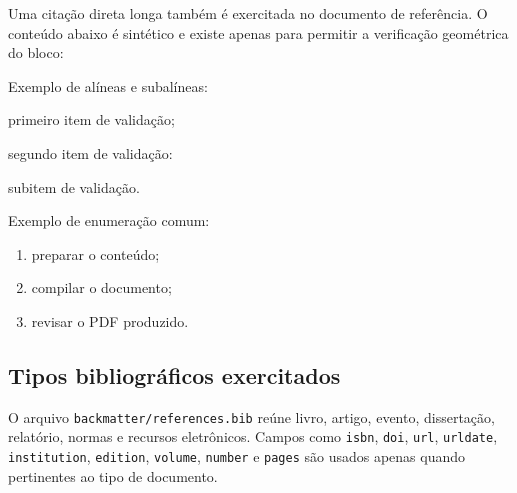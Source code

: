 Uma citação direta longa também é exercitada no documento de referência. O conteúdo abaixo é sintético e existe apenas para permitir a verificação geométrica do bloco:


Exemplo de alíneas e subalíneas:

\begin{ufclettereditems}
  \item primeiro item de validação;
  \item segundo item de validação:
    \begin{ufcdashedsubitems}
      \item subitem de validação.
    \end{ufcdashedsubitems}
\end{ufclettereditems}

Exemplo de enumeração comum:

\begin{enumerate}
  \item preparar o conteúdo;
  \item compilar o documento;
  \item revisar o PDF produzido.
\end{enumerate}

\subsection{Tipos bibliográficos exercitados}

O arquivo \texttt{backmatter/references.bib} reúne livro, artigo, evento, dissertação, relatório, normas e recursos eletrônicos. Campos como \texttt{isbn}, \texttt{doi}, \texttt{url}, \texttt{urldate}, \texttt{institution}, \texttt{edition}, \texttt{volume}, \texttt{number} e \texttt{pages} são usados apenas quando pertinentes ao tipo de documento.

\nocite{lamport1994,wessberg2000,vaswani2017attention,almeida2018,rfc9110}

